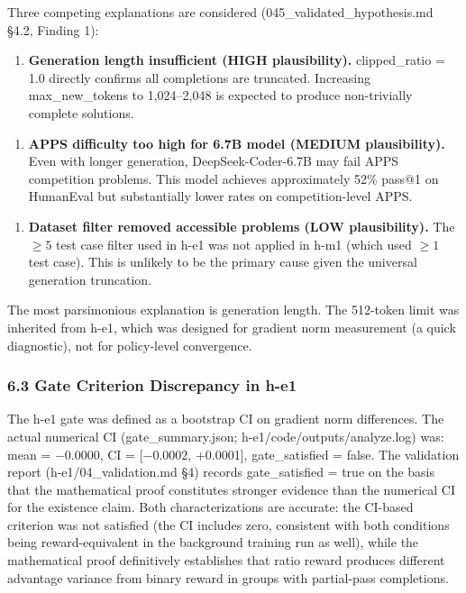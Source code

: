 Three competing explanations are considered (045\_validated\_hypothesis.md §4.2, Finding 1):

\begin{enumerate}
\item \textbf{Generation length insufficient (HIGH plausibility).} clipped\_ratio = 1.0 directly confirms all completions are truncated. Increasing max\_new\_tokens to 1,024--2,048 is expected to produce non-trivially complete solutions.
\end{enumerate}

\begin{enumerate}
\item \textbf{APPS difficulty too high for 6.7B model (MEDIUM plausibility).} Even with longer generation, DeepSeek-Coder-6.7B may fail APPS competition problems. This model achieves approximately 52\% pass@1 on HumanEval but substantially lower rates on competition-level APPS.
\end{enumerate}

\begin{enumerate}
\item \textbf{Dataset filter removed accessible problems (LOW plausibility).} The $\geq 5$ test case filter used in h-e1 was not applied in h-m1 (which used $\geq 1$ test case). This is unlikely to be the primary cause given the universal generation truncation.
\end{enumerate}

The most parsimonious explanation is generation length. The 512-token limit was inherited from h-e1, which was designed for gradient norm measurement (a quick diagnostic), not for policy-level convergence.

\subsubsection{6.3 Gate Criterion Discrepancy in h-e1}

The h-e1 gate was defined as a bootstrap CI on gradient norm differences. The actual numerical CI (gate\_summary.json; h-e1/code/outputs/analyze.log) was: mean = $-0.0000$, CI = [$-0.0002$, +0.0001], gate\_satisfied = false. The validation report (h-e1/04\_validation.md §4) records gate\_satisfied = true on the basis that the mathematical proof constitutes stronger evidence than the numerical CI for the existence claim. Both characterizations are accurate: the CI-based criterion was not satisfied (the CI includes zero, consistent with both conditions being reward-equivalent in the background training run as well), while the mathematical proof definitively establishes that ratio reward produces different advantage variance from binary reward in groups with partial-pass completions.

